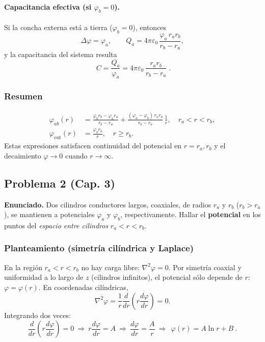 \documentclass{article}
\begin{document}
\paragraph{Capacitancia efectiva (si $\varphi_b=0$).}
Si la concha externa está a tierra ($\varphi_b=0$), entonces
\[
\Delta\varphi=\varphi_a,\qquad Q_a=4\pi\varepsilon_0\,\frac{\varphi_a\,r_a r_b}{r_b-r_a},
\]
y la capacitancia del sistema resulta
\[
\boxed{\;C=\frac{Q_a}{\varphi_a}=4\pi\varepsilon_0\,\frac{r_a r_b}{r_b-r_a}\;}.
\]

\subsubsection*{Resumen}
\[
\boxed{
\begin{aligned}
\varphi_{ab}(r)
&=\frac{\varphi_b r_b-\varphi_a r_a}{\,r_b-r_a\,}
+\frac{(\varphi_a-\varphi_b)\,r_a r_b}{\,r_b-r_a\,}\,\frac{1}{r},\quad r_a<r<r_b,\\[6pt]
\varphi_{\text{out}}(r)&=\frac{\varphi_b r_b}{r},\quad r\ge r_b.
\end{aligned}}
\]
Estas expresiones satisfacen continuidad del potencial en $r=r_a,r_b$ y el decaimiento $\varphi\to 0$ cuando $r\to\infty$.


\subsection{Problema 2 (Cap. 3)} \vspace{0.5cm}

\textbf{Enunciado.} Dos cilindros conductores largos, coaxiales, de radios $r_a$ y $r_b$ ($r_b>r_a$), se mantienen a potenciales $\varphi_a$ y $\varphi_b$, respectivamente. Hallar el \textbf{potencial} en los puntos del \emph{espacio entre cilindros} $r_a<r<r_b$.

\subsubsection*{Planteamiento (simetría cilíndrica y Laplace)}
En la región $r_a<r<r_b$ no hay carga libre: $\nabla^2\varphi=0$. Por simetría coaxial y uniformidad a lo largo de $z$ (cilindros infinitos), el potencial sólo depende de $r$: $\varphi=\varphi(r)$. En coordenadas cilíndricas,
\[
\nabla^2\varphi=\frac{1}{r}\frac{d}{dr}\!\left(r\frac{d\varphi}{dr}\right)=0.
\]
Integrando dos veces:
\[
\frac{d}{dr}\!\left(r\frac{d\varphi}{dr}\right)=0
\ \Rightarrow\ 
r\frac{d\varphi}{dr}=A
\ \Rightarrow\ 
\frac{d\varphi}{dr}=\frac{A}{r}
\ \Rightarrow\ 
\boxed{\ \varphi(r)=A\ln r+B\ }.
\]
\end{document}
